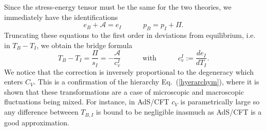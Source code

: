\documentclass[12pt,onecolumn,showpacs,amssymb,aps,nofootinbib,floatfix]{revtex4-2}
\renewcommand{\eqref}[1]{Eq.~(\ref{#1})}
\begin{document}
	Since the stress-energy tensor must be the same for the two theories, we immediately have the identifications
	\begin{equation}
          \label{identifications}
		e_B +\mathcal{A} = e_I  \quad \quad \quad p_B = p_I +\Pi.
	\end{equation}
	Truncating these equations to the first order in deviations from equilibrium, i.e. in $T_B-T_I$, we obtain the bridge formula
	\begin{equation}\label{BridgeFormulaAA}
		T_B - T_I = \frac{\Pi}{s_I} = -\frac{\mathcal{A}}{c_v^I}  \quad \quad \quad \text{with} \quad \quad \quad c_v^I := \frac{de_I}{dT_I}.
	\end{equation}
	We notice that the correction is inversely proportional to the degeneracy which enters $C_V$.  This is a confirmation of the hierarchy \eqref{hyerarchym}, where it is shown that these transformations are a case of microscopic and macroscopic fluctuations being mixed.  For instance, in AdS/CFT $c_V$ is parametrically large so any difference betweeen $T_{B,I}$ is bound to be negligible inasmuch as AdS/CFT is a good approximation.
        	
\end{document}
